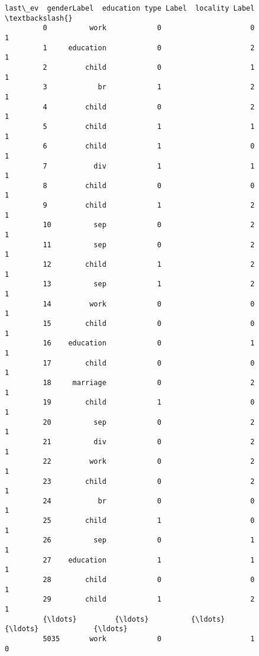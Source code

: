 \documentclass[11pt]{article}
\begin{document}
\begin{Verbatim}[commandchars=\\\{\}]
                 last\_ev  genderLabel  education type Label  locality Label  \textbackslash{}
         0          work            0                     0               1   
         1     education            0                     2               1   
         2         child            0                     1               1   
         3            br            1                     2               1   
         4         child            0                     2               1   
         5         child            1                     1               1   
         6         child            1                     0               1   
         7           div            1                     1               1   
         8         child            0                     0               1   
         9         child            1                     2               1   
         10          sep            0                     2               1   
         11          sep            0                     2               1   
         12        child            1                     2               1   
         13          sep            1                     2               1   
         14         work            0                     0               1   
         15        child            0                     0               1   
         16    education            0                     1               1   
         17        child            0                     0               1   
         18     marriage            0                     2               1   
         19        child            1                     0               1   
         20          sep            0                     2               1   
         21          div            0                     2               1   
         22         work            0                     2               1   
         23        child            0                     2               1   
         24           br            0                     0               1   
         25        child            1                     0               1   
         26          sep            0                     1               1   
         27    education            1                     1               1   
         28        child            0                     0               1   
         29        child            1                     2               1   
         {\ldots}         {\ldots}          {\ldots}                   {\ldots}             {\ldots}   
         5035       work            0                     1               0   

\end{Verbatim}
\end{document}
